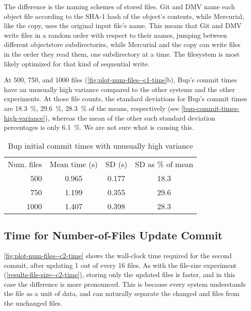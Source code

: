 The difference is the naming schemes of stored files. Git and DMV name each
object file according to the SHA-1 hash of the object's contents, while
Mercurial, like the copy, uses the original input file's name. This means that
Git and DMV write files in a random order with respect to their names, jumping
between different \gls{objectstore} subdirectories, while Mercurial and the copy
can write files in the order they read them, one subdirectory at a time. The
filesystem is most likely optimized for that kind of sequential write.

At \num{500}, \num{750}, and \num{1000} files
(\autoref{fig:plot-num-files--c1-time}b), Bup's commit times have an unusually
high variance compared to the other systems and the other experiments. At those
file counts, the standard deviations for Bup's commit times are
\SI{18.3}{\percent}, \SI{29.6}{\percent}, \SI{28.3}{\percent} of the means,
respectively (see \autoref{bup-commit-times-high-variance}), whereas the mean of
the other such standard deviation percentages is only \SI{6.1}{\percent}. We are
not sure what is causing this.

\begin{table}[h]
    \caption{Bup initial commit times with unusually high variance}
    \label{bup-commit-times-high-variance}
    \centering
    \begin{tabular}{rccc}
        Num. files & Mean time (s) & SD (s) & SD as \% of mean \\
           500  &   0.965  &   0.177  &  18.3 \\
           750  &   1.199  &   0.355  &  29.6 \\
          1000  &   1.407  &   0.398  &  28.3 \\
    \end{tabular}
\end{table}

%


\cleardoublepage

\subsection{Time for Number-of-Files Update Commit}

\autoref{fig:plot-num-files--c2-time} shows the wall-clock time required for the
second \gls{commit}, after updating \num{1} out of every \num{16} files. As with
the file-size experiment (\autoref{results-file-size--c2-time}), storing only
the updated files is faster, and in this case the difference is more pronounced.
This is because every system understands the file as a unit of data, and can
naturally separate the changed and files from the unchanged files.

